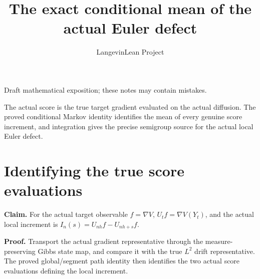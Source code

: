 \documentclass[11pt,a4paper]{article}
\title{\texorpdfstring{The exact conditional mean of the actual Euler defect}{The exact conditional mean of the actual Euler defect}}
\author{LangevinLean Project}
\date{}
\begin{document}
\maketitle
Draft mathematical exposition; these notes may contain mistakes.


The actual score is the true target gradient evaluated on the actual diffusion. The proved conditional Markov identity identifies the mean of every genuine score increment, and integration gives the precise semigroup source for the actual local Euler defect.


\section{\texorpdfstring{Identifying the true score evaluations}{Identifying the true score evaluations}}


\textbf{Claim.} For the actual target observable \(f=\nabla V\), \(U_tf=\nabla V(Y_t)\), and the actual local increment is \(I_n(s)=U_{nh}f-U_{nh+s}f\).



\textbf{Proof.} Transport the actual gradient representative through the measure-preserving Gibbs state map, and compare it with the true \(L^2\) drift representative. The proved global/\allowbreak{}segment path identity then identifies the two actual score evaluations defining the local increment.
\end{document}
